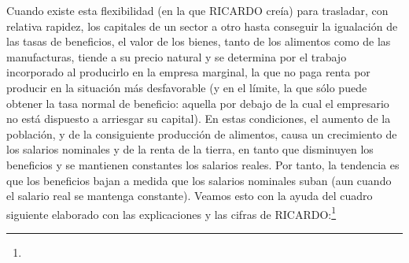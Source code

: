 \documentclass[10pt,a4paper]{article}
\begin{document}
Cuando existe esta flexibilidad (en la que RICARDO creía) para trasladar, con relativa rapidez, los capitales de un sector a otro hasta conseguir la igualación de las tasas de beneficios, el valor de los bienes, tanto de los alimentos como de las manufacturas, tiende a su precio natural y se determina por el trabajo incorporado al producirlo en la empresa marginal, la que no paga renta por producir en la situación más desfavorable (y en el límite, la que sólo puede obtener la tasa normal de beneficio: aquella por debajo de la cual el empresario no está dispuesto a arriesgar su capital). En estas condiciones, el aumento de la población, y de la consiguiente producción de alimentos, causa un crecimiento de los salarios nominales y de la renta de la tierra, en tanto que disminuyen los beneficios y se mantienen constantes los salarios reales. Por tanto, la tendencia es que los beneficios bajan a medida que los salarios nominales suban (aun cuando el salario real se mantenga constante). Veamos esto con la ayuda del cuadro siguiente elaborado con las explicaciones y las cifras de RICARDO:\footnote{%
}
\end{document}
